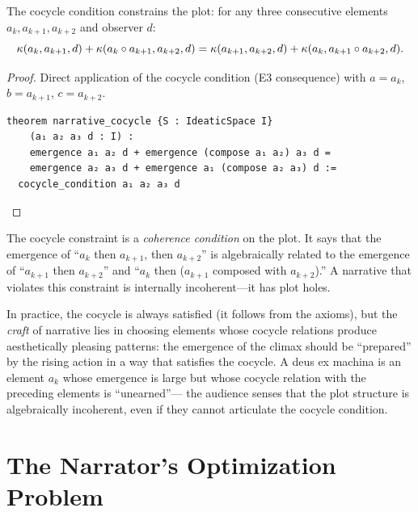 \begin{theorem}
\label{thm:narrative-cocycle}
The cocycle condition constrains the plot: for any three consecutive elements
$a_k, a_{k+1}, a_{k+2}$ and observer $d$:
\[
  \kappa(a_k, a_{k+1}, d) + \kappa(a_k \circ a_{k+1}, a_{k+2}, d) =
  \kappa(a_{k+1}, a_{k+2}, d) + \kappa(a_k, a_{k+1} \circ a_{k+2}, d).
\]
\end{theorem}

\begin{proof}
Direct application of the cocycle condition (E3 consequence) with
$a = a_k$, $b = a_{k+1}$, $c = a_{k+2}$.

\begin{lstlisting}[caption={Lean 4: Narrative cocycle}]
theorem narrative_cocycle {S : IdeaticSpace I}
    (a₁ a₂ a₃ d : I) :
    emergence a₁ a₂ d + emergence (compose a₁ a₂) a₃ d =
    emergence a₂ a₃ d + emergence a₁ (compose a₂ a₃) d :=
  cocycle_condition a₁ a₂ a₃ d
\end{lstlisting}
\end{proof}

\begin{interpretation}
\label{interp:coherence}
The cocycle constraint is a \emph{coherence condition} on the plot.  It says
that the emergence of ``$a_k$ then $a_{k+1}$, then $a_{k+2}$'' is
algebraically related to the emergence of ``$a_{k+1}$ then $a_{k+2}$'' and
``$a_k$ then ($a_{k+1}$ composed with $a_{k+2}$).''  A narrative that
violates this constraint is internally incoherent---it has plot holes.

In practice, the cocycle is always satisfied (it follows from the axioms),
but the \emph{craft} of narrative lies in choosing elements whose cocycle
relations produce aesthetically pleasing patterns: the emergence of the
climax should be ``prepared'' by the rising action in a way that satisfies
the cocycle.  A deus ex machina is an element $a_k$ whose emergence is large
but whose cocycle relation with the preceding elements is ``unearned''---
the audience senses that the plot structure is algebraically incoherent,
even if they cannot articulate the cocycle condition.
\end{interpretation}


\section{The Narrator's Optimization Problem}

